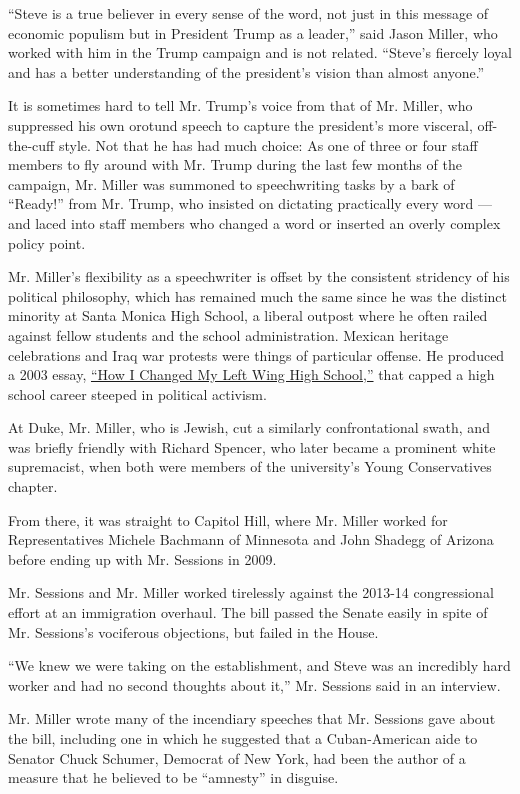 ``Steve is a true believer in every sense of the word, not just in this
message of economic populism but in President Trump as a leader,'' said
Jason Miller, who worked with him in the Trump campaign and is not
related. ``Steve's fiercely loyal and has a better understanding of the
president's vision than almost anyone.''

It is sometimes hard to tell Mr. Trump's voice from that of Mr. Miller,
who suppressed his own orotund speech to capture the president's more
visceral, off-the-cuff style. Not that he has had much choice: As one of
three or four staff members to fly around with Mr. Trump during the last
few months of the campaign, Mr. Miller was summoned to speechwriting
tasks by a bark of ``Ready!'' from Mr. Trump, who insisted on dictating
practically every word --- and laced into staff members who changed a
word or inserted an overly complex policy point.

Mr. Miller's flexibility as a speechwriter is offset by the consistent
stridency of his political philosophy, which has remained much the same
since he was the distinct minority at Santa Monica High School, a
liberal outpost where he often railed against fellow students and the
school administration. Mexican heritage celebrations and Iraq war
protests were things of particular offense. He produced a 2003 essay,
\href{http://archive.frontpagemag.com/readArticle.aspx?ARTID=17409}{``How
I Changed My Left Wing High School,''} that capped a high school career
steeped in political activism.

At Duke, Mr. Miller, who is Jewish, cut a similarly confrontational
swath, and was briefly friendly with Richard Spencer, who later became a
prominent white supremacist, when both were members of the university's
Young Conservatives chapter.

From there, it was straight to Capitol Hill, where Mr. Miller worked for
Representatives Michele Bachmann of Minnesota and John Shadegg of
Arizona before ending up with Mr. Sessions in 2009.

Mr. Sessions and Mr. Miller worked tirelessly against the 2013-14
congressional effort at an immigration overhaul. The bill passed the
Senate easily in spite of Mr. Sessions's vociferous objections, but
failed in the House.

``We knew we were taking on the establishment, and Steve was an
incredibly hard worker and had no second thoughts about it,'' Mr.
Sessions said in an interview.

Mr. Miller wrote many of the incendiary speeches that Mr. Sessions gave
about the bill, including one in which he suggested that a
Cuban-American aide to Senator Chuck Schumer, Democrat of New York, had
been the author of a measure that he believed to be ``amnesty'' in
disguise.

